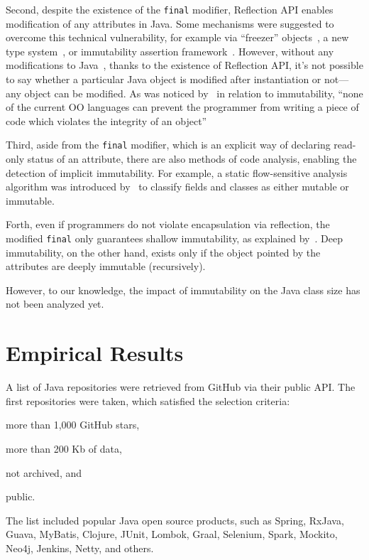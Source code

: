 \documentclass[sigconf]{acmart}
\begin{document}
Second, despite the existence of the \texttt{final} modifier, Reflection API enables
modification of any attributes in Java. Some mechanisms were suggested to
overcome this technical vulnerability, for example
via ``freezer'' objects~\citep{leino2008},
a new type system~\citep{tschantz2005},
or immutability assertion framework~\citep{pechtchanski2005}.
However, without any modifications to Java~\citep{steele2005},
thanks to the existence of Reflection API,
it's not possible to say whether a particular Java object is modified
after instantiation or not---any object can be modified. As was noticed
by~\citet{hakonen1999} in relation to immutability,
``none of the current OO languages can prevent the programmer from writing
a piece of code which violates the integrity of an object''

Third, aside from the \texttt{final} modifier, which is an explicit way of declaring
read-only status of an attribute, there are also methods of
code analysis, enabling the detection of implicit immutability. For example,
a static flow-sensitive analysis algorithm was introduced by~\citet{porat2000}
to classify fields and classes as either mutable or immutable.

Forth, even if programmers do not violate encapsulation via reflection, the
modified \texttt{final} only guarantees shallow immutability, as
explained by~\citet{hakonen1999}. Deep immutability, on the other hand,
exists only if the object pointed by the attributes are deeply immutable
(recursively).

However, to our knowledge, the impact of immutability on the Java
class size has not been analyzed yet.

\section{Empirical Results}
\label{sec:results}

A list of Java repositories were retrieved from GitHub via their
public API. The first \thetotalrepos{} repositories were taken, which satisfied
the selection criteria:
\begin{enumerate*}[label={\arabic*)}]
\item more than 1,000 GitHub stars,
\item more than 200 Kb of data,
\item not archived, and
\item public.
\end{enumerate*}
The list included popular Java open source products, such as
Spring, RxJava, Guava, MyBatis, Clojure, JUnit, Lombok,
Graal, Selenium, Spark, Mockito, Neo4j, Jenkins, Netty, and others.
\end{document}
